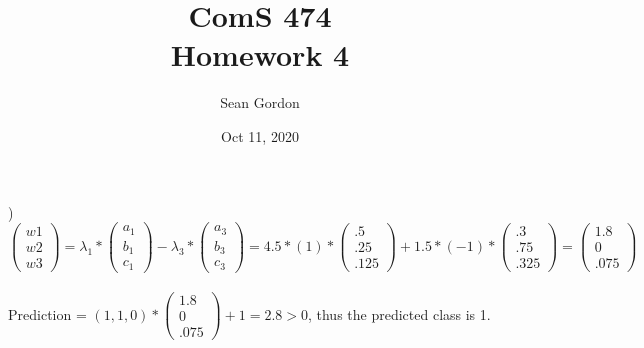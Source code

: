\documentclass[12pt]{article}
\title{ComS 474\\Homework 4}
\author{Sean Gordon}
\date{Oct 11, 2020}
\begin{document}
\maketitle



) $
\begin{pmatrix}
w1\\ w2\\ w3
\end{pmatrix}
= \lambda_1 *
\begin{pmatrix}
a_1\\ b_1\\ c_1
\end{pmatrix}
- \lambda_3 *
\begin{pmatrix}
a_3\\ b_3\\ c_3
\end{pmatrix}
= 4.5 * (1) *
\begin{pmatrix}
.5\\ .25\\ .125
\end{pmatrix}
+ 1.5 * (-1) *
\begin{pmatrix}
.3\\ .75\\ .325
\end{pmatrix}
=
\begin{pmatrix}
1.8\\ 0\\ .075
\end{pmatrix}$\\\\

Prediction = $(1, 1, 0)*
\begin{pmatrix}
1.8\\ 0\\ .075
\end{pmatrix}
+ 1 = 2.8 > 0$, thus the predicted class is 1.\\



\noindent \hrulefill \\
\end{document}
